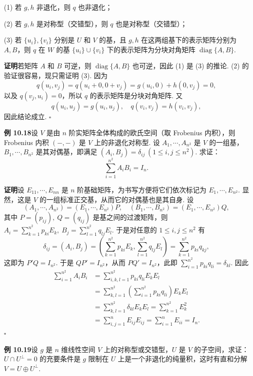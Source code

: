 \documentclass[UTF8,12pt,a4paper,fontset=fandol]{ctexart}
\begin{document}
(1) 若 $g,h$ 非退化，则 $q$ 也非退化；

(2) 若 $g,h$ 是对称型（交错型），则 $q$ 也是对称型（交错型）；

(3) 若 $\{u_i\},\{v_i\}$ 分别是 $U$ 和 $V$ 的基，且 $g,h$ 在这两组基下的表示矩阵分别为 $A,B$，则 $q$ 在 $W$ 的基 $\{u_i\}\cup\{v_i\}$ 下的表示矩阵为分块对角矩阵 $\operatorname{diag}\{A,B\}$.

\noindent\textbf{证明}\quad 若矩阵 $A$ 和 $B$ 可逆，则 $\operatorname{diag}\{A,B\}$ 也可逆，因此 (1) 是 (3) 的推论. (2) 的验证很容易，现只需证明 (3). 因为
\[
q(u_i,v_j)=q(u_i+0,0+v_j)=g(u_i,0)+h(0,v_j)=0,
\]
以及 $q(v_j,u_i)=0$，所以 $q$ 的表示矩阵是分块对角矩阵. 又
\[
q(u_i,u_j)=g(u_i,u_j),\quad q(v_i,v_j)=h(v_i,v_j),
\]
因此结论成立. $\square$

\noindent\textbf{例 10.18}\quad 设 $V$ 是由 $n$ 阶实矩阵全体构成的欧氏空间（取 Frobenius 内积），则 Frobenius 内积 $(-,-)$ 是 $V$ 上的非退化对称型. 设 $A_1,\cdots,A_{n^2}$ 是 $V$ 的一组基，$B_1,\cdots,B_{n^2}$ 是其对偶基，即满足 $(A_i,B_j)=\delta_{ij}\ (1\le i,j\le n^2)$. 求证：
\[
\sum_{i=1}^{n^2}A_iB_i=I_n.
\]

\noindent\textbf{证明}\quad 设 $E_{11},\cdots,E_{nn}$ 是 $n$ 阶基础矩阵，为书写方便将它们依次标记为 $E_1,\cdots,E_{n^2}$. 显然，这是 $V$ 的一组标准正交基，从而它的对偶基也是其自身. 设
\[
(A_1,\cdots,A_{n^2})=(E_1,\cdots,E_{n^2})P,\quad
(B_1,\cdots,B_{n^2})=(E_1,\cdots,E_{n^2})Q,
\]
其中 $P=(p_{ij}),\ Q=(q_{ij})$ 是基之间的过渡矩阵，则 $A_i=\sum_{k=1}^{n^2}p_{ki}E_k,\ B_j=\sum_{l=1}^{n^2}q_{lj}E_l$. 于是对任意的 $1\le i,j\le n^2$ 有
\[
\delta_{ij}=(A_i,B_j)=\left(\sum_{k=1}^{n^2}p_{ki}E_k,\sum_{l=1}^{n^2}q_{lj}E_l\right)=\sum_{k=1}^{n^2}p_{ki}q_{kj},
\]
这即为 $P'Q=I_{n^2}$. 于是 $QP'=I_{n^2}$，从而 $PQ'=I_{n^2}$，此即 $\sum_{i=1}^{n^2}p_{ki}q_{li}=\delta_{kl}$. 因此
\[
\begin{aligned}
\sum_{i=1}^{n^2}A_iB_i
&=\sum_{i,k,l=1}^{n^2}p_{ki}q_{li}E_kE_l\\
&=\sum_{k,l=1}^{n^2}\left(\sum_{i=1}^{n^2}p_{ki}q_{li}\right)E_kE_l\\
&=\sum_{k,l=1}^{n^2}\delta_{kl}E_kE_l
=\sum_{k=1}^{n^2}E_k^2\\
&=\sum_{i,j=1}^n E_{ij}E_{ij}
=\sum_{i=1}^n E_{ii}=I_n.
\end{aligned}
\]
$\square$

\noindent\textbf{例 10.19}\quad 设 $g$ 是 $n$ 维线性空间 $V$ 上的对称型或交错型，$U$ 是 $V$ 的子空间，求证：$U\cap U^\perp=0$ 的充要条件是 $g$ 限制在 $U$ 上是一个非退化的纯量积，这时有直和分解 $V=U\oplus U^\perp$.
\end{document}
